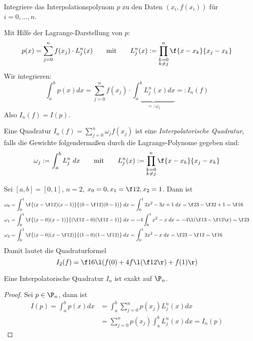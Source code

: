\documentclass[11pt]{scrbook}
\begin{document}
Integriere das Interpolationspolynom $p$ zu den Daten $(x_i,f(x_i))$ für $i=0,\dotsc,n$.

Mit Hilfe der Lagrange-Darstellung von $p$:
\[
	p(x) = \sum_{j=0}^n f(x_j) \cdot L_j^n (x) \qquad 
	\text{mit} 
	\qquad L_j^n(x) := \prod_{\substack{k=0\\k\neq j}}^n \f{x-x_k}{x_j-x_k}
\]
Wir integrieren:
\[
	\int_a^b p(x) dx = \sum_{j=0}^n f(x_j) \cdot \underbrace{\int_a^b L_j^n (x) dx}_{=:\omega_j} =: I_n(f)
\]
Also $I_n(f) = I(p)$.

\begin{df}
	\label{2.3}
	Eine Quadratur $I_n(f) = \sum_{j=0}^n \omega_j f(x_j)$ ist eine \emph{Interpolatorische Quadratur}, falls die Gewichte folgendermaßen durch die Lagrange-Polynome gegeben sind:
	\[
		\omega_j := \int_a^b L_j^n \;dx
		\qquad \text{mit} 
		\qquad L_j^n(x) := \prod_{\substack{k=0\\k\neq j}}^n \f{x-x_k}{x_j-x_k}
	\]
\end{df}

\begin{ex*}
	Sei $[a,b] = [0,1]$, $n=2$, $x_0=0, x_1=\f 12, x_2 = 1$.
	Dann ist
	\begin{align*}
		\omega_0 &= \int_0^1 \f {(x-\f 12) (x-1)}{(0-\f 12)(0-1)} \; dx = \int_0^1 2x^2 - 3x+1 \; dx = \f 23 - \f 32 + 1 = \f 16 \\
		\omega_1 &= \int_0^1 \f {(x-0)(x-1)}{(\f 12 - 0)(\f 12 -1)} \; dx = -4 \int_0^1x^2 - x \; dx = -4 \l( \f 13 - \f 12 \r) = \f 23 \\
		\omega_2 &= \int_0^1 \f {(x-0)(x-\f 12)}{(1-0)(1-\f 12)} \; dx = \int_0^1 2x^2 -x \; dx = \f 23 - \f 12 = \f 16
	\end{align*}
	Damit lautet die Quadraturformel
	\[
		I_2(f) = \f 16 \l( f(0) + 4f\l(\f 12\r) + f(1)\r)
	\]
\end{ex*}

\begin{st}
	\label{2.4}
	Eine Interpolatorische Quadratur $I_n$ ist exakt auf $\P_n$.
	\begin{proof}
		Sei $p\in \P_n$, dann ist
		\begin{align*}
			I(p) = \int_a^b p(x) dx &= \int_a^b \sum_{j=0}^n p(x_j) L_j^n(x) dx \\
			&= \sum_{j=0}^n p(x_j) \int_a^b L_j^n(x) dx = I_n(p)
		\end{align*}
	\end{proof}
\end{st}
\end{document}
